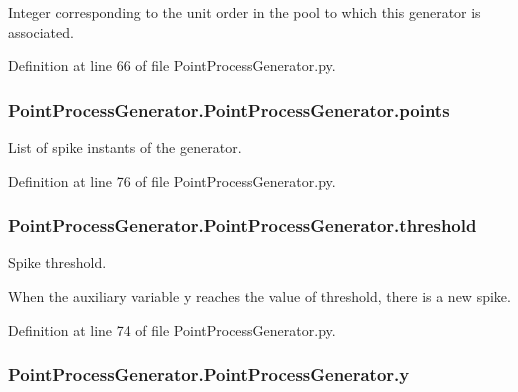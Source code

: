 Integer corresponding to the unit order in the pool to which this generator is associated. 



Definition at line 66 of file Point\-Process\-Generator.\-py.

\hypertarget{class_point_process_generator_1_1_point_process_generator_ab36d31f34c0330e13ae9732d53984bab}{
\subsubsection[{points}]{\setlength{\rightskip}{0pt plus 5cm}Point\-Process\-Generator.\-Point\-Process\-Generator.\-points}}\label{class_point_process_generator_1_1_point_process_generator_ab36d31f34c0330e13ae9732d53984bab}


List of spike instants of the generator. 



Definition at line 76 of file Point\-Process\-Generator.\-py.

\hypertarget{class_point_process_generator_1_1_point_process_generator_abcb23e09b752b797a1f11f2679373ca1}{
\subsubsection[{threshold}]{\setlength{\rightskip}{0pt plus 5cm}Point\-Process\-Generator.\-Point\-Process\-Generator.\-threshold}}\label{class_point_process_generator_1_1_point_process_generator_abcb23e09b752b797a1f11f2679373ca1}


Spike threshold. 

When the auxiliary variable y reaches the value of threshold, there is a new spike. 

Definition at line 74 of file Point\-Process\-Generator.\-py.

\hypertarget{class_point_process_generator_1_1_point_process_generator_a70a43b5c26daf20833ecbc9f4d979726}{
\subsubsection[{y}]{\setlength{\rightskip}{0pt plus 5cm}Point\-Process\-Generator.\-Point\-Process\-Generator.\-y}}\label{class_point_process_generator_1_1_point_process_generator_a70a43b5c26daf20833ecbc9f4d979726}


